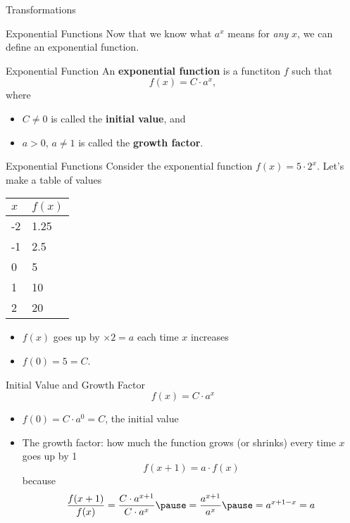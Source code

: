 \documentclass[]{beamer}
\begin{document}
	\begin{frame}{Transformations}
		
	\end{frame}
	
	\begin{frame}{Exponential Functions}
		Now that we know what $a^x$ means for \textit{any} $x$, we can define an exponential function.
		\vfill
		\begin{block}{Exponential Function}
			An \textbf{exponential function} is a functiton $f$ such that
			\begin{equation*}
				f(x) = C \cdot a^x,
			\end{equation*}
			where
			\begin{itemize}
				\item $C \ne 0$ is called the \textbf{initial value}, and
				\item $a > 0$, $a \ne 1$ is called the \textbf{growth factor}.
			\end{itemize}
		\end{block}
	\end{frame}

	\begin{frame}{Exponential Functions}
		Consider the exponential function $f(x) = 5\cdot 2^x$. Let's make a table of values
		\vfill
		\begin{center}
		\begin{tabular}{@{}ll@{}}
			$x$ & $f(x)$ \\
			\midrule
			-2 & 1.25 \\
			-1 & 2.5 \\
			0 & 5 \\
			1 & 10 \\
			2 & 20
		\end{tabular}
		\end{center}
		\vfill\pause
		\begin{itemize}
			\item $f(x)$ goes up by $\times 2 = a$ each time $x$ increases
			\vfill\pause
			\item $f(0) = 5 = C$.
		\end{itemize}
	\end{frame}
	
	\begin{frame}{Initial Value and Growth Factor}
		\begin{equation*}
			f(x) = C\cdot a^x
		\end{equation*}
		\vfill
		\begin{itemize}
			\item $f(0) = C\cdot a^0 = C$, the initial value
			\vfill\pause
			\item The growth factor: how much the function grows (or shrinks) every time $x$ goes up by 1
			\begin{equation*}
				f(x+1) = a\cdot f(x)
			\end{equation*}
			\pause
			because
			\begin{equation*}
				\frac{f(x+1)}{f(x)} = \frac{C\cdot a^{x+1}}{C\cdot a^x} \pause = \frac{a^{x+1}}{a^x} \pause = a^{x+1-x} = a
			\end{equation*}
		\end{itemize}
	\end{frame}
	
\end{document}
